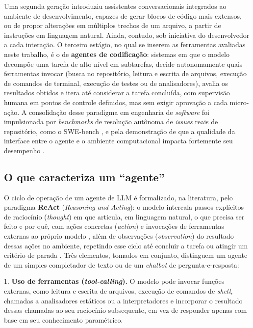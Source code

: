 Uma segunda geração introduziu assistentes conversacionais integrados ao ambiente de desenvolvimento, capazes de gerar blocos de código mais extensos, ou de propor alterações em múltiplos trechos de um arquivo, a partir de instruções em linguagem natural. Ainda, contudo, sob iniciativa do desenvolvedor a cada interação. O terceiro estágio, no qual se inserem as ferramentas avaliadas neste trabalho, é o de \textbf{agentes de codificação}: sistemas em que o modelo decompõe uma tarefa de alto nível em subtarefas, decide autonomamente quais ferramentas invocar (busca no repositório, leitura e escrita de arquivos, execução de comandos de terminal, execução de testes ou de analisadores), avalia os resultados obtidos e itera até considerar a tarefa concluída, com supervisão humana em pontos de controle definidos, mas sem exigir aprovação a cada micro-ação. A consolidação desse paradigma em engenharia de \textit{software} foi impulsionada por \textit{benchmarks} de resolução autônoma de \textit{issues} reais de repositório, como o SWE-bench \cite{Jimenez2024SWEbench}, e pela demonstração de que a qualidade da interface entre o agente e o ambiente computacional impacta fortemente seu desempenho \cite{Yang2024SWEagent}.


\subsection{O que caracteriza um ``agente''}\label{subsec:caracterizacao-agente}
O ciclo de operação de um agente de LLM é formalizado, na literatura, pelo paradigma \textbf{ReAct} (\textit{Reasoning and Acting}): o modelo intercala passos explícitos de raciocínio (\textit{thought})  em que articula, em linguagem natural, o que precisa ser feito e por quê, com ações concretas (\textit{action}) e invocações de ferramentas externas ao próprio modelo , além de observações (\textit{observation}) do resultado dessas ações no ambiente, repetindo esse ciclo até concluir a tarefa ou atingir um critério de parada \cite{Yao2023ReAct}. Três elementos, tomados em conjunto, distinguem um agente de um simples completador de texto ou de um \textit{chatbot} de pergunta-e-resposta:

1. \textbf{Uso de ferramentas (\textit{tool-calling}).} O modelo pode invocar funções externas, como leitura e escrita de arquivos, execução de comandos de \textit{shell}, chamadas a analisadores estáticos ou a interpretadores  e incorporar o resultado dessas chamadas ao seu raciocínio subsequente, em vez de responder apenas com base em seu conhecimento paramétrico.

